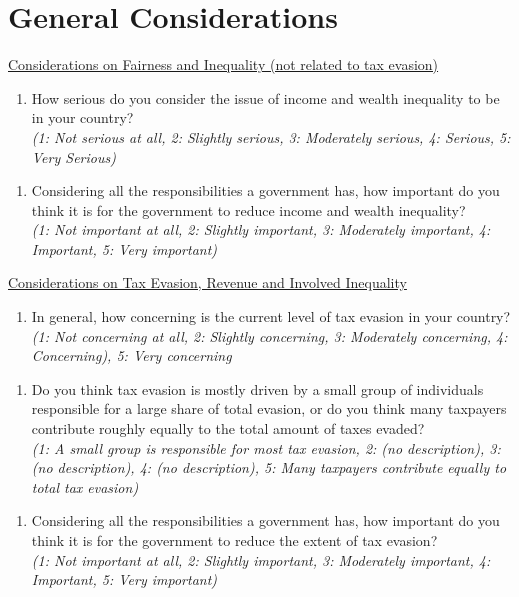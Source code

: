 \documentclass[11pt]{article}
\begin{document}
\section*{General Considerations}
\underline{Considerations on Fairness and Inequality (not related to tax evasion)}
\
\begin{enumerate}[resume]
    \item How serious do you consider the issue of income and wealth inequality to be in your country?\\
    \textit{(1: Not serious at all, 2: Slightly serious, 3: Moderately serious, 4: Serious, 5: Very Serious)}
\end{enumerate}
\begin{enumerate}[resume]
    \item Considering all the responsibilities a government has, how important do you think it is for the government to reduce income and wealth inequality? \\
    \textit{(1: Not important at all, 2: Slightly important, 3: Moderately important, 4: Important, 5: Very important)}
\end{enumerate}
\underline{Considerations on Tax Evasion, Revenue and Involved Inequality}
\begin{enumerate}[resume]
    \item In general, how concerning is the current level of tax evasion in your country?\\
    \textit{(1: Not concerning at all, 2: Slightly concerning, 3: Moderately concerning, 4: Concerning), 5: Very concerning}
\end{enumerate}
\begin{enumerate}[resume]
    \item Do you think tax evasion is mostly driven by a small group of individuals responsible for a large share of total evasion, or do you think many taxpayers contribute roughly equally to the total amount of taxes evaded?\\
    \textit{(1: A small group is responsible for most tax evasion, 2: (no description), 3: (no description), 4: (no description), 5: Many taxpayers contribute equally to total tax evasion)}
    \end{enumerate}
\begin{enumerate}[resume]
    \item Considering all the responsibilities a government has, how important do you think it is for the government to reduce the extent of tax evasion?\\
    \textit{(1: Not important at all, 2: Slightly important, 3: Moderately important, 4: Important, 5: Very important)} 
\end{enumerate}
\end{document}
